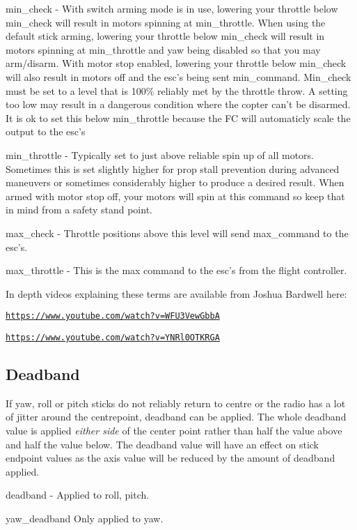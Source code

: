 {\ttfamily min\+\_\+check} -\/ With switch arming mode is in use, lowering your throttle below min\+\_\+check will result in motors spinning at min\+\_\+throttle. When using the default stick arming, lowering your throttle below min\+\_\+check will result in motors spinning at min\+\_\+throttle and yaw being disabled so that you may arm/disarm. With motor stop enabled, lowering your throttle below min\+\_\+check will also result in motors off and the esc's being sent min\+\_\+command. Min\+\_\+check must be set to a level that is 100\% reliably met by the throttle throw. A setting too low may result in a dangerous condition where the copter can’t be disarmed. It is ok to set this below min\+\_\+throttle because the F\+C will automaticly scale the output to the esc's

{\ttfamily min\+\_\+throttle} -\/ Typically set to just above reliable spin up of all motors. Sometimes this is set slightly higher for prop stall prevention during advanced maneuvers or sometimes considerably higher to produce a desired result. When armed with motor stop off, your motors will spin at this command so keep that in mind from a safety stand point.

{\ttfamily max\+\_\+check} -\/ Throttle positions above this level will send max\+\_\+command to the esc's.

{\ttfamily max\+\_\+throttle} -\/ This is the max command to the esc's from the flight controller.

In depth videos explaining these terms are available from Joshua Bardwell here\+:

\href{https://www.youtube.com/watch?v=WFU3VewGbbA}{\tt https\+://www.\+youtube.\+com/watch?v=\+W\+F\+U3\+Vew\+Gbb\+A}

\href{https://www.youtube.com/watch?v=YNRl0OTKRGA}{\tt https\+://www.\+youtube.\+com/watch?v=\+Y\+N\+Rl0\+O\+T\+K\+R\+G\+A}

\subsection*{Deadband}

If yaw, roll or pitch sticks do not reliably return to centre or the radio has a lot of jitter around the centrepoint, deadband can be applied. The whole deadband value is applied {\itshape either side} of the center point rather than half the value above and half the value below. The deadband value will have an effect on stick endpoint values as the axis value will be reduced by the amount of deadband applied.

{\ttfamily deadband} -\/ Applied to roll, pitch.

{\ttfamily yaw\+\_\+deadband} Only applied to yaw. 